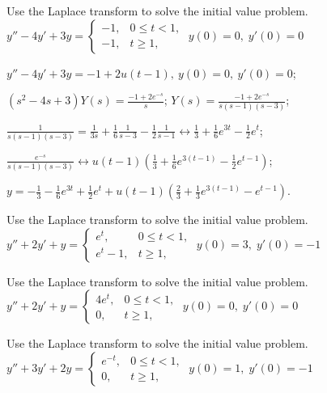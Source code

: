 \documentclass{ximera}
\begin{document}
\begin{problem}\label{exer:8.5.14} Use the Laplace transform to solve the initial value problem.
$y''-4y'+3y=\left\{\begin{array}{cl}-1,&0\le
t<1,\\-1,&t\ge 1,\end{array}\right.\;  y(0)=0,\;  y'(0)=0$

\begin{solution}
$y''-4y'+3y=-1+2u(t-1),\ y(0)=0,\ y'(0)=0$;

$(s^2-4s+3)Y(s)=\frac{-1+2e^{-s}}{s}$;
$Y(s)=\frac{-1+2e^{-s}}{s(s-1)(s-3)}$;

$\frac{1}{s(s-1)(s-3)}=\frac{1}{3s}+\frac{1}{6}\frac{1}{s-3}-\frac{1}{2}\frac{1}{s-1}
\leftrightarrow \frac{1}{3}+\frac{1}{6}e^{3t}-\frac{1}{2}e^t$;

$\frac{e^{-s}}{s(s-1)(s-3)}
\leftrightarrow u(t-1)\left(
\frac{1}{3}+\frac{1}{6}e^{3(t-1)}-\frac{1}{2}e^{t-1}\right)$;

$y=-\frac{1}{3}-\frac{1}{6}e^{3t}
+\frac{1}{2}e^t+u(t-1)\left(\frac{2}{3}+\frac{1}{3}e^{3(t-1)}
-e^{t-1}\right)$.
\end{solution}
\end{problem}

\begin{problem}\label{exer:8.5.15} Use the Laplace transform to solve the initial value problem.
$y''+2y'+y=\left\{\begin{array}{cl}
e^t,&0\le t<1,\\e^t-1,&t\ge 1,\end{array}\right.\;  y(0)=3,\;
y'(0)=-1$
\end{problem}

\begin{problem}\label{exer:8.5.16}
Use the Laplace transform to solve the initial value problem.
$y''+2y'+y=\left\{\begin{array}{cl}
4e^t,&0\le t<1,\\0,&t\ge 1,\end{array}\right.\;  y(0)=0,\;
y'(0)=0$
\end{problem}

\begin{problem}\label{exer:8.5.17} Use the Laplace transform to solve the initial value problem.
$y''+3y'+2y=\left\{\begin{array}{cl}
e^{-t},&0\le t<1,\\0,&t\ge 1,\end{array}\right.\;  y(0)=1,\;  y'(0)=-1$
\end{problem}
\end{document}
